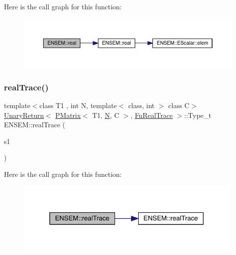Here is the call graph for this function\+:\nopagebreak
\begin{figure}[H]
\begin{center}
\leavevmode
\includegraphics[width=350pt]{df/d0a/group__primmatrix_ga5d6f44c46b47f8dc972b40a518058e0e_cgraph}
\end{center}
\end{figure}
\mbox{\label{group__primmatrix_gaf2db8b017f816bb958ba639899fa1cf7}} 
\subsubsection{\texorpdfstring{realTrace()}{realTrace()}}
{\footnotesize\ttfamily template$<$class T1 , int N, template$<$ class, int $>$ class C$>$ \\
\mbox{\hyperlink{structENSEM_1_1UnaryReturn}{Unary\+Return}}$<$ \mbox{\hyperlink{classENSEM_1_1PMatrix}{P\+Matrix}}$<$ T1, \mbox{\hyperlink{operator__name__util_8cc_a7722c8ecbb62d99aee7ce68b1752f337}{N}}, C $>$, \mbox{\hyperlink{structENSEM_1_1FnRealTrace}{Fn\+Real\+Trace}} $>$\+::Type\+\_\+t E\+N\+S\+E\+M\+::real\+Trace (\begin{DoxyParamCaption}\item[{const \mbox{\hyperlink{classENSEM_1_1PMatrix}{P\+Matrix}}$<$ T1, \mbox{\hyperlink{operator__name__util_8cc_a7722c8ecbb62d99aee7ce68b1752f337}{N}}, C $>$ \&}]{s1 }\end{DoxyParamCaption})\hspace{0.3cm}{\ttfamily [inline]}}

Here is the call graph for this function\+:\nopagebreak
\begin{figure}[H]
\begin{center}
\leavevmode
\includegraphics[width=314pt]{df/d0a/group__primmatrix_gaf2db8b017f816bb958ba639899fa1cf7_cgraph}
\end{center}
\end{figure}
\mbox{\label{group__primmatrix_ga9f1d3892badcfa2bf78d97c42c8a05e5}} 
